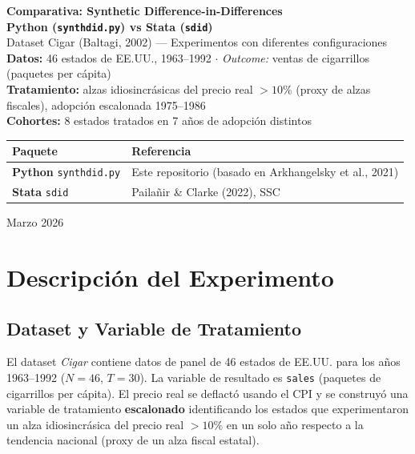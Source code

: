 \documentclass[11pt, a4paper]{article}
\newcommand{\py}{\textcolor{pyblue}{\textbf{Python}}}
\newcommand{\st}{\textcolor{stgreen}{\textbf{Stata}}}
\begin{document}
\begin{titlepage}
  \centering
  \vspace*{3cm}
  {\LARGE\bfseries Comparativa: Synthetic Difference-in-Differences\\[0.4em]
  \py{} (\texttt{synthdid.py}) vs \st{} (\texttt{sdid})\\[1em]}
  {\large Dataset Cigar (Baltagi, 2002) --- Experimentos con diferentes configuraciones}\\[2em]
  {\normalsize
    \textbf{Datos:} 46 estados de EE.UU., 1963--1992 $\cdot$ \textit{Outcome:} ventas de cigarrillos (paquetes per c\'apita)\\[0.3em]
    \textbf{Tratamiento:} alzas idiosincrásicas del precio real $>10\%$ (proxy de alzas fiscales), adopción escalonada 1975--1986\\[0.3em]
    \textbf{Cohortes:} 8 estados tratados en 7 años de adopción distintos\\[2em]
  }
  {\small
    \begin{tabular}{ll}
      \toprule
      \textbf{Paquete} & \textbf{Referencia} \\
      \midrule
      \py{} \texttt{synthdid.py} & Este repositorio (basado en Arkhangelsky et al., 2021) \\
      \st{} \texttt{sdid} & Pailañir \& Clarke (2022), SSC \\
      \bottomrule
    \end{tabular}
  }
  \vfill
  {\small Marzo 2026}
\end{titlepage}

\tableofcontents
\newpage

\section{Descripción del Experimento}

\subsection*{Dataset y Variable de Tratamiento}

El dataset \textit{Cigar} contiene datos de panel de 46 estados de EE.UU. para los años 1963--1992 ($N=46$, $T=30$). La variable de resultado es \texttt{sales} (paquetes de cigarrillos per c\'apita). El precio real se deflact\'o usando el CPI y se construy\'o una variable de tratamiento \textbf{escalonado} identificando los estados que experimentaron un alza idiosincrásica del precio real $>10\%$ en un solo año respecto a la tendencia nacional (proxy de un alza fiscal estatal).
\end{document}
